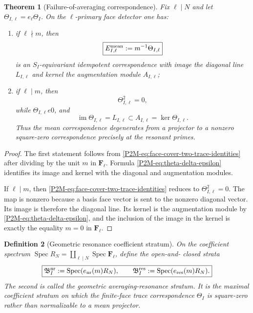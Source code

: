 \documentclass[11pt]{article}
\newtheorem{theorem}{Theorem}[section]
\newtheorem{definition}[theorem]{Definition}
\theoremstyle{remark}
\newcommand{\Spec}{\operatorname{Spec}}
\begin{document}
\begin{theorem}[Failure-of-averaging correspondence]
\label{P2M-thm:failure-of-averaging-correspondence}
Fix \(\ell\mid N\) and let \(\Theta_{I,\ell}=e_\ell\Theta_I\).  On the
\(\ell\)-primary face detector one has:
\begin{enumerate}[label=\textup{(\roman*)}]
\item if \(\ell\nmid m\), then
\begin{equation}
 \boxed{
 E_{I,\ell}^{\rm mean}:=m^{-1}\Theta_{I,\ell}}
\end{equation}
is an \(S_I\)-equivariant idempotent correspondence with image the diagonal
line \(L_{I,\ell}\) and kernel the augmentation module \(A_{I,\ell}\);
\item if \(\ell\mid m\), then
\begin{equation}
 \boxed{\Theta_{I,\ell}^2=0,}
\end{equation}
while \(\Theta_{I,\ell}
e0\), and
\begin{equation}
 \boxed{
 \operatorname{im}\Theta_{I,\ell}=L_{I,\ell}
 \subset A_{I,\ell}=\ker\Theta_{I,\ell}.}
\end{equation}
Thus the mean correspondence degenerates from a projector to a nonzero
square-zero correspondence precisely at the resonant primes.
\end{enumerate}
\end{theorem}

\begin{proof}
The first statement follows from
\eqref{P2M-eq:face-cover-two-trace-identities} after dividing by the unit \(m\) in
\(\mathbf F_\ell\).  Formula \eqref{P2M-eq:theta-delta-epsilon} identifies its
image and kernel with the diagonal and augmentation modules.

If \(\ell\mid m\), then
\eqref{P2M-eq:face-cover-two-trace-identities} reduces to
\(\Theta_{I,\ell}^2=0\).  The map is nonzero because a basis face vector is
sent to the nonzero diagonal vector.  Its image is therefore the diagonal
line.  Its kernel is the augmentation module by
\eqref{P2M-eq:theta-delta-epsilon}, and the inclusion of the image in the kernel
is exactly the equality \(m=0\) in \(\mathbf F_\ell\).
\end{proof}

\begin{definition}[Geometric resonance coefficient stratum]
\label{P2M-def:geometric-resonance-stratum}
On the coefficient spectrum
\(\Spec R_N=\coprod_{\ell\mid N}\Spec\mathbf F_\ell\), define the open-and-
closed strata
\begin{equation}
 \boxed{
 \mathfrak B_I^{\rm nr}:=\Spec(e_{\rm nr}(m)R_N),
 \qquad
 \mathfrak B_I^{\rm res}:=\Spec(e_{\rm res}(m)R_N).}
\end{equation}
The second is called the \emph{geometric averaging-resonance stratum}.  It is
the maximal coefficient stratum on which the finite-face trace
correspondence \(\Theta_I\) is square-zero rather than normalizable to a mean
projector.
\end{definition}
\end{document}
